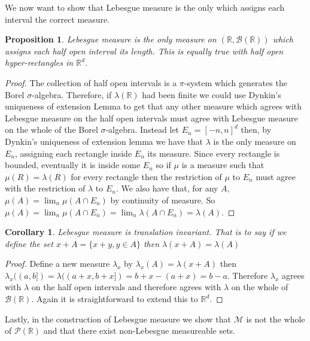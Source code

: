 \documentclass[11pt]{article}
\newtheorem{cor}[thm]{Corollary}
\newtheorem{prp}[thm]{Proposition}
\theoremstyle{definition}
\theoremstyle{remark}
\begin{document}
We now want to show that Lebesgue measure is the only which assigns each interval the correct measure. 
\begin{prp}
Lebesgue measure is the only measure on $(\mathbb{R}, \mathcal{B}(\mathbb{R}))$ which assigns each half open interval its length. This is equally true with half open hyper-rectangles in $\mathbb{R}^d$.
\end{prp}
\begin{proof}
The collection of half open intervals is a $\pi$-system which generates the Borel $\sigma$-algebra. Therefore, if $\lambda(\mathbb{R})$ had been finite we could use Dynkin's uniqueness of extension Lemma to get that any other measure which agrees with Lebesgue measure on the half open intervals must agree with Lebesgue measure on the whole of the Borel $\sigma$-algebra. Instead let $E_n = [-n,n]^d$ then, by Dynkin's uniqueness of extension lemma we have that $\lambda$ is the only measure on $E_n$, assigning each rectangle inside $E_n$ its measure. Since every rectangle is bounded, eventually it is inside some $E_n$ so if $\mu$ is a measure such that $\mu(R) = \lambda(R)$ for every rectangle then the restriction of $\mu$ to $E_n$ must agree with the restriction of $\lambda$ to $E_n$. We also have that, for any $A$, $\mu(A) = \lim_n \mu(A \cap E_n)$ by continuity of measure. So $\mu(A) = \lim_n \mu(A\cap E_n) = \lim_n \lambda(A \cap E_n) = \lambda(A)$.
\end{proof}

\begin{cor}
Lebesgue measure is translation invariant. That is to say if we define the set $x+A = \{ x+y, y \in A\}$ then $\lambda(x+A) = \lambda(A)$
\end{cor}
\begin{proof}
Define a new measure $\lambda_x$ by $\lambda_x(A) = \lambda(x+A)$ then $\lambda_x((a,b]) = \lambda((a+x,b+x]) = b+x -(a+x) = b-a$. Therefore $\lambda_x$ agrees with $\lambda$ on the half open intervals and therefore agrees with $\lambda$ on the whole of $\mathcal{B}(\mathbb{R})$. Again it is straightforward to extend this to $\mathbb{R}^d$.
\end{proof}

Lastly, in the construction of Lebesgue measure we show that $\mathscr{M}$ is not the whole of $\mathscr{P}(\mathbb{R})$ and that there exist non-Lebesgue measureable sets.
\end{document}
